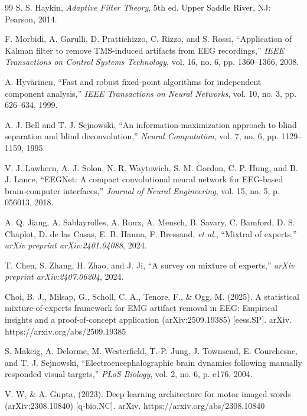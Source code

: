 \documentclass{article}
\begin{document}
\begin{thebibliography}{99}
S. S. Haykin, \textit{Adaptive Filter Theory}, 5th ed. Upper Saddle River, NJ: Pearson, 2014.

F. Morbidi, A. Garulli, D. Prattichizzo, C. Rizzo, and S. Rossi, ``Application of Kalman filter to remove TMS-induced artifacts from EEG recordings,'' \textit{IEEE Transactions on Control Systems Technology}, vol. 16, no. 6, pp. 1360--1366, 2008.

A. Hyv\"{a}rinen, ``Fast and robust fixed-point algorithms for independent component analysis,'' \textit{IEEE Transactions on Neural Networks}, vol. 10, no. 3, pp. 626--634, 1999.

A. J. Bell and T. J. Sejnowski, ``An information-maximization approach to blind separation and blind deconvolution,'' \textit{Neural Computation}, vol. 7, no. 6, pp. 1129--1159, 1995.

V. J. Lawhern, A. J. Solon, N. R. Waytowich, S. M. Gordon, C. P. Hung, and B. J. Lance, ``EEGNet: A compact convolutional neural network for EEG-based brain-computer interfaces,'' \textit{Journal of Neural Engineering}, vol. 15, no. 5, p. 056013, 2018.

A. Q. Jiang, A. Sablayrolles, A. Roux, A. Mensch, B. Savary, C. Bamford, D. S. Chaplot, D. de las Casas, E. B. Hanna, F. Bressand, \textit{et al.}, ``Mixtral of experts,'' \textit{arXiv preprint arXiv:2401.04088}, 2024.

T. Chen, S. Zhang, H. Zhao, and J. Ji, ``A survey on mixture of experts,'' \textit{arXiv preprint arXiv:2407.06204}, 2024.

Choi, B. J., Milsap, G., Scholl, C. A., Tenore, F., $\&$ Ogg, M. (2025). A statistical mixture-of-experts framework for EMG artifact removal in EEG: Empirical insights and a proof-of-concept application (arXiv:2509.19385) [eess.SP]. arXiv. https://arxiv.org/abs/2509.19385

S. Makeig, A. Delorme, M. Westerfield, T.-P. Jung, J. Townsend, E. Courchesne, and T. J. Sejnowski, ``Electroencephalographic brain dynamics following manually responded visual targets,'' \textit{PLoS Biology}, vol. 2, no. 6, p. e176, 2004.

V. W, $\&$ A. Gupta,  (2023). Deep learning architecture for motor imaged words (arXiv:2308.10840) [q-bio.NC]. arXiv. https://arxiv.org/abs/2308.10840


\end{thebibliography}
\end{document}
